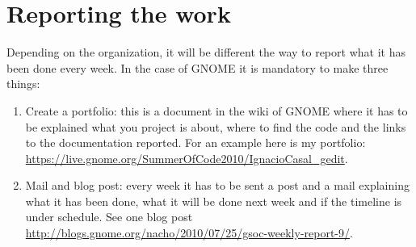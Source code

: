 \section{Reporting the work}\label{ReportingGSoC}

Depending on the organization, it will be different the way to report what it has been done every week. In the case of GNOME it is mandatory to make three things:

\begin{enumerate}
  \item Create a portfolio: this is a document in the wiki of GNOME where it has to be explained what you project is about, where to find the code and the links to the documentation reported. For an example here is my portfolio: \url{https://live.gnome.org/SummerOfCode2010/IgnacioCasal_gedit}.
  \item Mail and blog post: every week it has to be sent a post and a mail explaining what it has been done, what it will be done next week and if the timeline is under schedule. See one blog post \url{http://blogs.gnome.org/nacho/2010/07/25/gsoc-weekly-report-9/}.
\end{enumerate}
